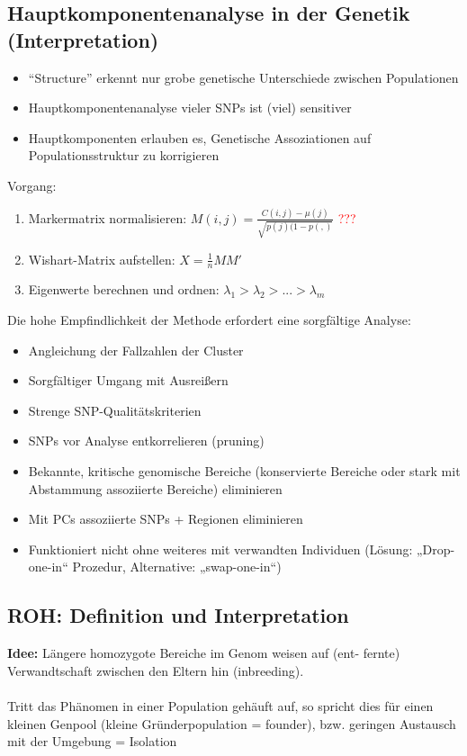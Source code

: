 \subsection{Hauptkomponentenanalyse in der Genetik (Interpretation)}
\begin{itemize}
	\item “Structure” erkennt nur grobe genetische Unterschiede zwischen Populationen
	\item Hauptkomponentenanalyse vieler SNPs ist (viel) sensitiver
	\item Hauptkomponenten erlauben es, Genetische Assoziationen auf Populationsstruktur zu korrigieren
\end{itemize}

Vorgang:
\begin{enumerate}
	\item Markermatrix normalisieren: $M(i,j)=\frac{C(i,j) - \mu(j)}{\sqrt{p(j)(1-p(,)}}$ \textcolor{red}{???}
	\item Wishart-Matrix aufstellen: $X=\frac{1}{n}MM'$
	\item Eigenwerte berechnen und ordnen: $\lambda_1 > \lambda_2 > ... > \lambda_m$
\end{enumerate}

Die hohe Empfindlichkeit der Methode erfordert eine sorgfältige Analyse:
\begin{itemize}
	\item Angleichung der Fallzahlen der Cluster
	\item Sorgfältiger Umgang mit Ausreißern
	\item Strenge SNP-Qualitätskriterien
	\item SNPs vor Analyse entkorrelieren (pruning)
	\item Bekannte, kritische genomische Bereiche (konservierte Bereiche oder stark mit Abstammung assoziierte Bereiche) eliminieren
	\item Mit PCs assoziierte SNPs + Regionen eliminieren
	\item Funktioniert nicht ohne weiteres mit verwandten Individuen (Lösung: „Drop-one-in“ Prozedur, Alternative: „swap-one-in“)
\end{itemize}

\newpage
\subsection{ROH: Definition und Interpretation}
\textbf{Idee:} Längere homozygote Bereiche im Genom weisen auf (ent-
fernte) Verwandtschaft zwischen den Eltern hin (inbreeding).
\\\\
Tritt das Phänomen in einer Population gehäuft auf, so spricht dies
für einen kleinen Genpool (kleine Gründerpopulation = founder),
bzw. geringen Austausch mit der Umgebung = Isolation\\

